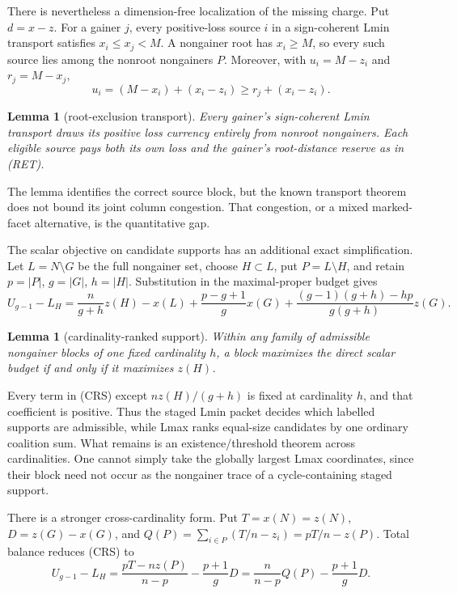 \documentclass[11pt]{article}
\newtheorem{lemma}[theorem]{Lemma}
\begin{document}
There is nevertheless a dimension-free localization of the missing charge.
Put $d=x-z$.  For a gainer $j$, every positive-loss source $i$ in a
sign-coherent Lmin transport satisfies $x_i\le x_j<M$.  A nongainer root has
$x_i\ge M$, so every such source lies among the nonroot nongainers $P$.
Moreover, with $u_i=M-z_i$ and $r_j=M-x_j$,
\[
 u_i=(M-x_i)+(x_i-z_i)\ge r_j+(x_i-z_i).             \tag{RET}
\]

\begin{lemma}[root-exclusion transport]
Every gainer's sign-coherent Lmin transport draws its positive loss currency
entirely from nonroot nongainers.  Each eligible source pays both its own
loss and the gainer's root-distance reserve as in \textup{(RET)}.
\end{lemma}

The lemma identifies the correct source block, but the known transport
theorem does not bound its joint column congestion.  That congestion, or a
mixed marked-facet alternative, is the quantitative gap.

The scalar objective on candidate supports has an additional exact
simplification.  Let $L=N\setminus G$ be the full nongainer set, choose
$H\subset L$, put $P=L\setminus H$, and retain
$p=|P|$, $g=|G|$, $h=|H|$.  Substitution in the maximal-proper budget gives
\[
 U_{g-1}-L_H=\frac{n}{g+h}z(H)-x(L)+\frac{p-g+1}{g}x(G)
 +\frac{(g-1)(g+h)-hp}{g(g+h)}z(G).                \tag{CRS}
\]

\begin{lemma}[cardinality-ranked support]
Within any family of admissible nongainer blocks of one fixed cardinality
$h$, a block maximizes the direct scalar budget if and only if it maximizes
$z(H)$.
\end{lemma}

Every term in (CRS) except $nz(H)/(g+h)$ is fixed at cardinality $h$, and
that coefficient is positive.  Thus the staged Lmin packet decides which
labelled supports are admissible, while Lmax ranks equal-size candidates by
one ordinary coalition sum.  What remains is an existence/threshold theorem
across cardinalities.  One cannot simply take the globally largest Lmax
coordinates, since their block need not occur as the nongainer trace of a
cycle-containing staged support.

There is a stronger cross-cardinality form.  Put $T=x(N)=z(N)$,
$D=z(G)-x(G)$, and
$Q(P)=\sum_{i\in P}(T/n-z_i)=pT/n-z(P)$.  Total balance reduces (CRS) to
\[
 U_{g-1}-L_H=\frac{pT-nz(P)}{n-p}-\frac{p+1}{g}D
 =\frac{n}{n-p}Q(P)-\frac{p+1}{g}D.                 \tag{EDQ}
\]
\end{document}
